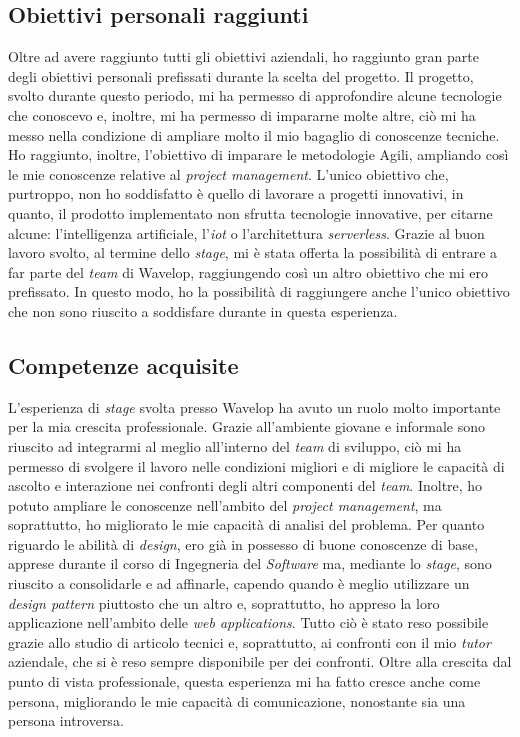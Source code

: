 \subsection{Obiettivi personali raggiunti}
Oltre ad avere raggiunto tutti gli obiettivi aziendali, ho raggiunto gran parte degli obiettivi personali prefissati durante la scelta del progetto.
Il progetto, svolto durante questo periodo, mi ha permesso di approfondire alcune tecnologie che conoscevo e, inoltre, mi ha permesso di impararne molte altre, ciò mi ha messo nella condizione di ampliare molto il mio bagaglio di conoscenze tecniche. 
Ho raggiunto, inoltre, l'obiettivo di imparare le metodologie Agili, ampliando così le mie conoscenze relative al \emph{project management}.
L'unico obiettivo che, purtroppo, non ho soddisfatto è quello di lavorare a progetti innovativi, in quanto, il prodotto implementato non sfrutta tecnologie innovative, per citarne alcune: l'intelligenza artificiale, l'\emph{\acrlong{iot}} o l'architettura \emph{serverless}.
Grazie al buon lavoro svolto, al termine dello \emph{stage}, mi è stata offerta la possibilità di entrare a far parte del \emph{team} di Wavelop, raggiungendo così un altro obiettivo che mi ero prefissato.
In questo modo, ho la possibilità di raggiungere anche l'unico obiettivo che non sono riuscito a soddisfare durante in questa esperienza.

\subsection{Competenze acquisite}
L'esperienza di \emph{stage} svolta presso Wavelop ha avuto un ruolo molto importante per la mia crescita professionale.
Grazie all'ambiente giovane e informale sono riuscito ad integrarmi al meglio all'interno del \emph{team} di sviluppo, ciò mi ha permesso di svolgere il lavoro nelle condizioni migliori e di migliore le capacità di ascolto e interazione nei confronti degli altri componenti del \emph{team}.
Inoltre, ho potuto ampliare le conoscenze nell'ambito del \emph{project management}, ma soprattutto, ho migliorato le mie capacità di analisi del problema.
Per quanto riguardo le abilità di \emph{design}, ero già in possesso di buone conoscenze di base, apprese durante il corso di Ingegneria del \emph{Software} ma, mediante lo \emph{stage}, sono riuscito a consolidarle e ad affinarle, capendo quando è meglio utilizzare un \emph{design pattern} piuttosto che un altro e, soprattutto, ho appreso la loro applicazione nell'ambito delle \emph{web applications}.
Tutto ciò è stato reso possibile grazie allo studio di articolo tecnici e, soprattutto, ai confronti con il mio \emph{tutor} aziendale, che si è reso sempre disponibile per dei confronti.
Oltre alla crescita dal punto di vista professionale, questa esperienza mi ha fatto cresce anche come persona, migliorando le mie capacità di comunicazione, nonostante sia una persona introversa.

